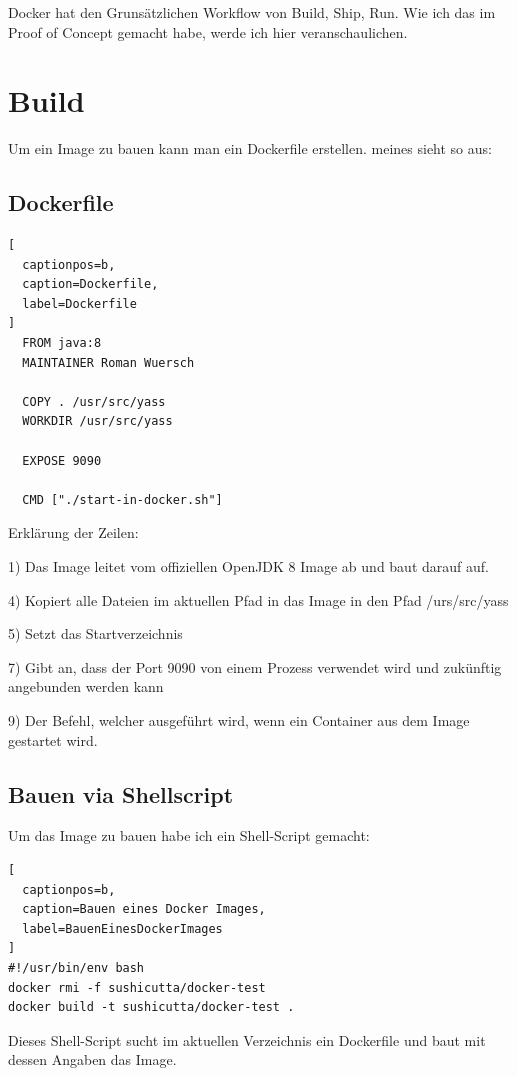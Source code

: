 Docker hat den Grunsätzlichen Workflow von Build, Ship, Run. Wie ich das im Proof of Concept
gemacht habe, werde ich hier veranschaulichen.

\section{Build}

Um ein Image zu bauen kann man ein Dockerfile erstellen. meines sieht so aus:

\subsection{Dockerfile}

\begin{lstlisting}[
  captionpos=b,
  caption=Dockerfile,
  label=Dockerfile
]
  FROM java:8
  MAINTAINER Roman Wuersch

  COPY . /usr/src/yass
  WORKDIR /usr/src/yass

  EXPOSE 9090

  CMD ["./start-in-docker.sh"]
\end{lstlisting}

Erklärung der Zeilen:

1) Das Image leitet vom offiziellen OpenJDK 8 Image ab und baut darauf auf.

4) Kopiert alle Dateien im aktuellen Pfad in das Image in den Pfad /urs/src/yass

5) Setzt das Startverzeichnis

7) Gibt an, dass der Port 9090 von einem Prozess verwendet wird und zukünftig angebunden werden kann

9) Der Befehl, welcher ausgeführt wird, wenn ein Container aus dem Image gestartet wird.

\subsection{Bauen via Shellscript}

Um das Image zu bauen habe ich ein Shell-Script gemacht:
\\

\begin{lstlisting}[
  captionpos=b,
  caption=Bauen eines Docker Images,
  label=BauenEinesDockerImages
]
#!/usr/bin/env bash
docker rmi -f sushicutta/docker-test
docker build -t sushicutta/docker-test .
\end{lstlisting}

Dieses Shell-Script sucht im aktuellen Verzeichnis ein Dockerfile und baut mit dessen
Angaben das Image.


